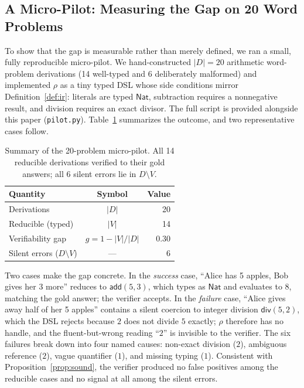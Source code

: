 \documentclass[11pt]{article}
\theoremstyle{definition}
\theoremstyle{plain}
\theoremstyle{remark}
\begin{document}
\subsection{A Micro-Pilot: Measuring the Gap on 20 Word Problems}\label{sec:pilot}
To show that the gap is measurable rather than merely defined, we ran a small, fully
reproducible micro-pilot. We hand-constructed $|D| = 20$ arithmetic word-problem derivations
(14 well-typed and 6 deliberately malformed) and implemented $\rho$ as a tiny typed DSL whose
side conditions mirror Definition~\ref{def:ir}: literals are typed $\mathsf{Nat}$, subtraction
requires a nonnegative result, and division requires an exact divisor. The full script is
provided alongside this paper (\texttt{pilot.py}). Table~\ref{tab:pilot} summarizes the
outcome, and two representative cases follow.

\begin{table}[t]
\centering
\small
\begin{tabular}{@{}l c r@{}}
\toprule
\textbf{Quantity} & \textbf{Symbol} & \textbf{Value}\\
\midrule
Derivations & $|D|$ & 20\\
Reducible (typed) & $|V|$ & 14\\
Verifiability gap & $g = 1 - |V|/|D|$ & $0.30$\\
Silent errors ($D \setminus V$) & --- & 6\\
\bottomrule
\end{tabular}
\caption{Summary of the 20-problem micro-pilot. All 14 reducible derivations verified to
their gold answers; all 6 silent errors lie in $D \setminus V$.}
\label{tab:pilot}
\end{table}

Two cases make the gap concrete. In the \emph{success} case, ``Alice has 5 apples, Bob gives
her 3 more'' reduces to $\mathsf{add}(5,3)$, which types as $\mathsf{Nat}$ and evaluates to
$8$, matching the gold answer; the verifier accepts. In the \emph{failure} case, ``Alice gives
away half of her 5 apples'' contains a silent coercion to integer division
$\mathsf{div}(5,2)$, which the DSL rejects because $2$ does not divide $5$ exactly; $\rho$
therefore has no handle, and the fluent-but-wrong reading ``$2$'' is invisible to the verifier.
The six failures break down into four named causes: non-exact division ($2$), ambiguous
reference ($2$), vague quantifier ($1$), and missing typing ($1$). Consistent with
Proposition~\ref{prop:sound}, the verifier produced no false positives among the reducible
cases and no signal at all among the silent errors.
\end{document}
